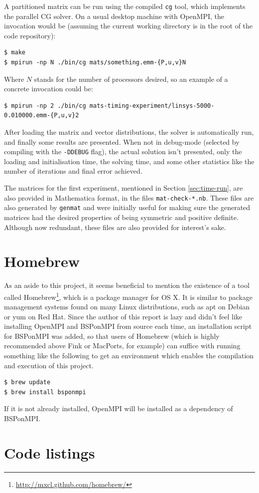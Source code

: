 \documentclass[a4paper]{article}
\begin{document}
A partitioned matrix can be run using the compiled \texttt{cg} tool, which implements the parallel CG solver. On
a usual desktop machine with OpenMPI, the invocation would be (assuming the current working directory is in
the root of the code repository):

\begin{verbatim}
$ make
$ mpirun -np N ./bin/cg mats/something.emm-{P,u,v}N
\end{verbatim}

Where $N$ stands for the number of processors desired, so an example of a concrete invocation could be:
\begin{verbatim}
$ mpirun -np 2 ./bin/cg mats-timing-experiment/linsys-5000-0.010000.emm-{P,u,v}2
\end{verbatim}

After loading the matrix and vector distributions, the solver is automatically
run, and finally some results are presented. When not in debug-mode (selected by compiling
with the \texttt{-DDEBUG} flag), the actual solution isn't presented, only the loading and
initialisation time, the solving time, and some other statistics like the number of iterations
and final error achieved.

The matrices for the first experiment, mentioned in Section \ref{sec:time-run}, are also provided
in Mathematica format, in the files \texttt{mat-check-*.nb}. These files are also generated by \texttt{genmat} and
were initially useful for making sure the generated matrices had the desired properties of being
symmetric and positive definite. Although now redundant, these files are also provided for interest's sake.

\clearpage
\section{Homebrew}

As an aside to this project, it seems beneficial to mention the existence of a
tool called Homebrew\footnote{\url{http://mxcl.github.com/homebrew/}}, which is
a package manager for OS X. It is similar to package management systems found
on many Linux distributions, such as apt on Debian or yum on Red Hat. Since the
author of this report is lazy and didn't feel like installing OpenMPI and
BSPonMPI from source each time, an installation script for BSPonMPI was added,
so that users of Homebrew (which is highly recommended above Fink or MacPorts,
for example) can suffice with running something like the following to get an
environment which enables the compilation and execution of this project.

\begin{verbatim}
$ brew update
$ brew install bsponmpi
\end{verbatim}

If it is not already installed, OpenMPI will be installed as a dependency of BSPonMPI.

\section{Code listings}




\end{document}
